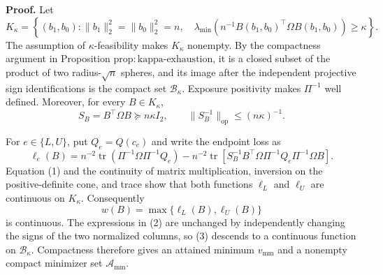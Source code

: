 \textbf{Proof.}
Let
\[
K_\kappa=\left\{(b_1,b_0):
\lVert b_1\rVert_2^2=\lVert b_0\rVert_2^2=n,\quad
\lambda_{\min}\!\left(n^{-1}B(b_1,b_0)^{\top}\Omega
B(b_1,b_0)\right)\geq\kappa\right\}.
\]
The assumption of \(\kappa\)-feasibility makes \(K_\kappa\) nonempty.  By the compactness argument in Proposition \(\mathrm{prop{:}kappa\mbox{-}exhaustion}\), it is a closed subset of the product of two radius-\(\sqrt n\) spheres, and its image after the independent projective sign identifications is the compact set \(\mathcal B_\kappa\).  Exposure positivity makes \(\Pi^{-1}\) well defined.  Moreover, for every \(B\in K_\kappa\),
\[
S_B=B^{\top}\Omega B\succeq n\kappa I_2,
\qquad
\lVert S_B^{-1}\rVert_{\mathrm{op}}\leq (n\kappa)^{-1}. \tag{1}
\]

For \(e\in\{L,U\}\), put \(Q_e=Q(c_e)\) and write the endpoint loss as
\[
\ell_e(B)
=n^{-2}\operatorname{tr}\!\left(\Pi^{-1}\Omega\Pi^{-1}Q_e\right)
-n^{-2}\operatorname{tr}\!\left[
S_B^{-1}B^{\top}\Omega\Pi^{-1}Q_e\Pi^{-1}\Omega B
\right]. \tag{2}
\]
Equation (1) and the continuity of matrix multiplication, inversion on the positive-definite cone, and trace show that both functions \(\ell_L\) and \(\ell_U\) are continuous on \(K_\kappa\).  Consequently
\[
w(B)=\max\{\ell_L(B),\ell_U(B)\} \tag{3}
\]
is continuous.  The expressions in (2) are unchanged by independently changing the signs of the two normalized columns, so (3) descends to a continuous function on \(\mathcal B_\kappa\).  Compactness therefore gives an attained minimum \(v_{\mathrm{mm}}\) and a nonempty compact minimizer set \(\mathcal A_{\mathrm{mm}}\).

